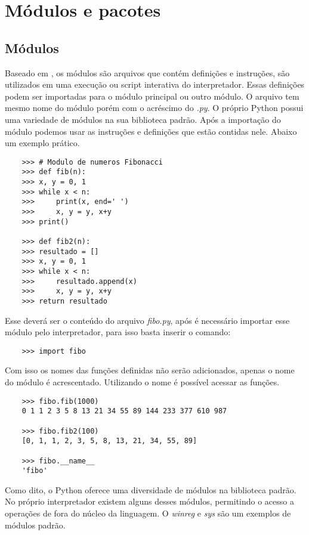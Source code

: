	
    \section{Módulos e pacotes}



            \subsection{Módulos}
	Baseado em \cite{Perkovic2016}, os módulos são arquivos que contém definições e instruções, são utilizados em uma execução ou script interativa do interpretador. Essas definições podem ser importadas para o módulo principal ou outro módulo. O arquivo tem mesmo nome do módulo porém com o acréscimo do \textit{.py}. O próprio Python possui uma variedade de módulos na sua biblioteca padrão. Após a importação do módulo podemos usar as instruções e definições que estão contidas nele. Abaixo um exemplo prático. 
	\begin{lstlisting}
	>>> # Modulo de numeros Fibonacci 
	>>> def fib(n):   
	>>>	x, y = 0, 1
	>>>	while x < n:
	>>>		print(x, end=' ')
	>>>		x, y = y, x+y
	>>>	print()
		
	>>> def fib2(n):   
	>>>	resultado = []
	>>>	x, y = 0, 1
	>>>	while x < n:
	>>>		resultado.append(x)
	>>>		x, y = y, x+y
	>>>	return resultado
	\end{lstlisting}

	Esse deverá ser o conteúdo do arquivo \textit{fibo.py}, após é necessário importar esse módulo pelo interpretador, para isso basta inserir o comando:
	
	\begin{lstlisting}
	>>> import fibo
	\end{lstlisting}
	Com isso os nomes das funções definidas não serão adicionados, apenas o nome do módulo é acrescentado. Utilizando o nome é possível acessar as funções.
	\begin{lstlisting}
	>>> fibo.fib(1000)
	0 1 1 2 3 5 8 13 21 34 55 89 144 233 377 610 987
	
	>>> fibo.fib2(100)
	[0, 1, 1, 2, 3, 5, 8, 13, 21, 34, 55, 89]
	
	>>> fibo.__name__
	'fibo'
	\end{lstlisting}
	Como dito, o Python oferece uma diversidade de módulos na biblioteca padrão. No próprio interpretador existem alguns desses módulos, permitindo o acesso a operações de fora do núcleo da linguagem. O \textit{winreg} e \textit{sys} são um exemplos de módulos padrão.
